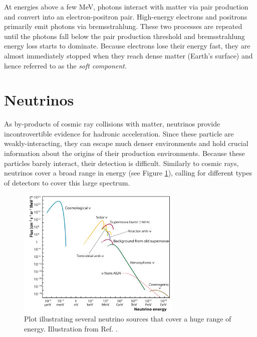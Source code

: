 At energies above a few MeV, photons interact with matter via pair production and convert into an electron-positron pair. High-energy electrons and positrons primarily emit photons via bremsstrahlung. These two processes are repeated until the photons fall below the pair production threshold and bremsstrahlung energy loss starts to dominate. Because electrons lose their energy fast, they are almost immediately stopped when they reach dense matter (Earth's surface) and hence referred to as the \textit{soft component}.


\section{Neutrinos}
\label{sec:neutrinos}
As by-products of cosmic ray collisions with matter, neutrinos provide incontrovertible evidence for hadronic acceleration. Since these particle are weakly-interacting, they can escape much denser environments and hold crucial information about the origins of their production environments. Because these particles barely interact, their detection is difficult. Similarly to cosmic rays, neutrinos cover a broad range in energy (see Figure \ref{fig:neutrinospectrumall}), calling for different types of detectors to cover this large spectrum. 

\begin{figure}[t]
\centering
\includegraphics[width=0.7\textwidth]{chapter3/img/neutrinospectrum.png}
\caption{Plot illustrating several neutrino sources that cover a huge range of energy. Illustration from Ref. \cite{Katz:2011ke}.}
\label{fig:neutrinospectrumall}
\end{figure}

